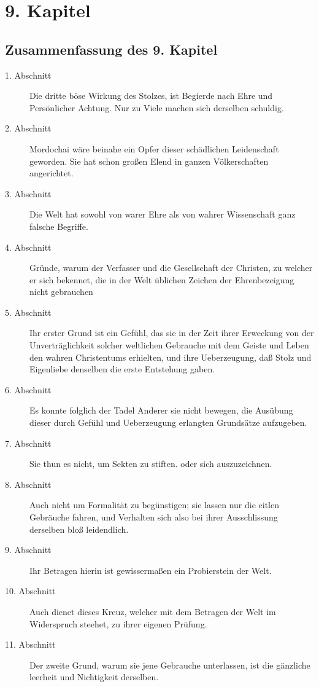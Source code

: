 
\chapter{9. Kapitel} \label{kap9}


\section{Zusammenfassung des 9. Kapitel}
\footnotesize
\begin{description}
\item[1. Abschnitt] Die dritte böse Wirkung des Stolzes, ist Begierde nach Ehre
und Persönlicher Achtung. Nur zu Viele machen sich derselben schuldig.
\item[2. Abschnitt] Mordochai wäre beinahe ein Opfer dieser schädlichen
Leidenschaft geworden. Sie hat schon großen Elend in ganzen Völkerschaften
angerichtet.
\item[3. Abschnitt] Die Welt hat sowohl von warer Ehre als von wahrer
Wissenschaft ganz falsche Begriffe.
\item[4. Abschnitt] Gründe, warum der Verfasser und die Gesellschaft der
Christen, zu welcher er sich bekennet, die in der Welt üblichen Zeichen der
Ehrenbezeigung nicht gebrauchen
\item[5. Abschnitt] Ihr erster Grund ist ein Gefühl, das sie in der Zeit ihrer
Erweckung von der Unverträglichkeit solcher weltlichen Gebrauche mit dem Geiste
und Leben den wahren Christentums erhielten, und ihre Ueberzeugung, daß Stolz
und Eigenliebe denselben die erste Entstehung gaben.
\item[6. Abschnitt] Es konnte folglich der Tadel Anderer sie nicht bewegen, die
Ausübung dieser durch Gefühl und Ueberzeugung erlangten Grundsätze aufzugeben.
\item[7. Abschnitt] Sie thun es nicht, um Sekten zu stiften. oder sich
auszuzeichnen.
\item[8. Abschnitt] Auch nicht um Formalität zu begünstigen; sie lassen nur die
eitlen Gebräuche fahren, und Verhalten sich also bei ihrer Ausschlissung
derselben bloß leidendlich.
\item[9. Abschnitt] Ihr Betragen hierin ist gewissermaßen ein Probierstein der
Welt.
\item[10. Abschnitt] Auch dienet dieses Kreuz, welcher mit dem Betragen der Welt
im Widerspruch steehet, zu ihrer eigenen Prüfung.
\item[11. Abschnitt] Der zweite Grund, warum sie jene Gebrauche unterlassen, ist
die gänzliche leerheit und Nichtigkeit derselben.

\end{description}
